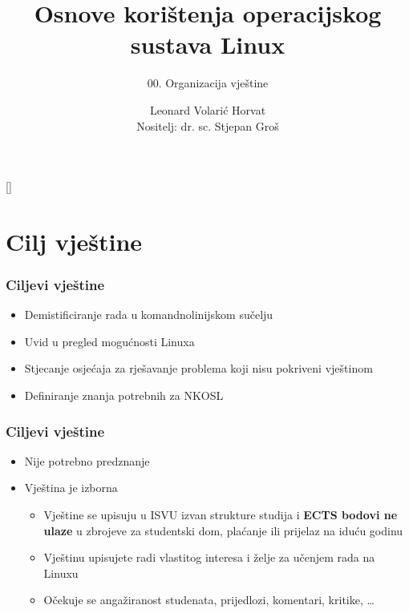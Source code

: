 \documentclass{beamer}
\title{Osnove korištenja operacijskog sustava Linux}
\subtitle{00. Organizacija vještine}
\author[Leonard Volarić Horvat]{Leonard Volarić Horvat\\{\small Nositelj: dr. sc. Stjepan Groš}}
\institute[FER]{Sveučilište u Zagrebu \\
				Fakultet elektrotehnike i računarstva}
\date{\todayiso}
\begin{document}
{
[] %

\begin{frame}
\maketitle
\end{frame}
}

\section{Cilj vještine}
\begin{frame}[t]
	\frametitle{Ciljevi vještine}
	\begin{itemize}
		\item Demistificiranje rada u komandnolinijskom sučelju
		\item Uvid u pregled mogućnosti Linuxa
		\item Stjecanje osjećaja za rješavanje problema koji nisu pokriveni vještinom
		\item Definiranje znanja potrebnih za NKOSL
	\end{itemize}
\end{frame}

\begin{frame}[t]
	\frametitle{Ciljevi vještine}
	\begin{itemize}
		\item Nije potrebno predznanje
		\item Vještina je izborna
		\begin{itemize}
			\item Vještine se upisuju u ISVU izvan strukture studija i \textbf{ECTS bodovi ne ulaze} u zbrojeve za studentski dom, plaćanje ili prijelaz na iduću godinu
			\item Vještinu upisujete radi vlastitog interesa i želje za učenjem rada na Linuxu
			\item Očekuje se angažiranost studenata, prijedlozi, komentari, kritike, \ldots
		\end{itemize}
	\end{itemize}
\end{frame}
\end{document}
